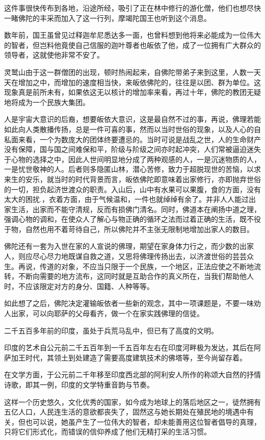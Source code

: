 \documentclass[twoside,openany]{book}
\begin{document}
这件事很快传布到各地，沿途所经，吸引了正在林中修行的游化僧，他们也想尽快一睹佛陀的丰采而加入了这一行列，摩竭陀国王也听到这个消息。

数年前，国王虽曾见过释迦牟尼悉达多一面，也曾料想到他将来必能成为一位伟大的智者，但岂料他竟使自己信服的迦叶尊者也皈依了他，成了一位拥有广大群众的领导者，这就使他非常不安了。

灵鹫山由于这一群僧团的出现，顿时热闹起来，自佛陀带弟子来到这里，人数一天天在增加之中，而增加的速度相当快，来皈依佛陀的，往往是以团、群为单位。这现象真是前所未有，如果依这无以核计的增加率来看，再过十年，佛陀的教团无疑地将成为一个民族大集团。

人是宇宙大意识的后裔，想要皈依大意识，这是最自然不过的事，再说，佛理若能如此向人类散播传扬，总是一件可喜的事，然而以当时世俗的现象，以及人心的自私面来看，一个为数庞大的团体终要遭忌的。当时可说是战乱之世，人的生命财产没有保障，国与国之间难保和平，阶级与阶级之间亦时起冲突，人们常被逼迫迷失于心物的选择之中，因此人世间明显地分成了两种观感的人，一是沉迷物质的人，一是忧世敬神的人。后者则多隐匿山林，潜心苦修，致力于超脱现世的苦恼，以求来生的安乐，就当时的时代背景而言，皈依佛陀即意味着出家修行，亦即抛弃世俗的一切，担负起济世渡众的职责。入山后，山中有水果可以果腹，食的方面，没有太大的困扰.，衣着方面，由于气候温和，一件也就绰绰有余了。并非人人能过出家生活，出家而不能守清规，反而有损佛门清名。同时，佛道本在阐扬中道之理，强调心物的调和，在使众人了解心与物正确的循环之法而过着正确的生活，既不役于物，自然也用不着苛待自己，所以佛陀并不主张无限制地增加出家人的数目。

佛陀还有一套为入世在家的人宣说的佛理，期望在家身体力行之，而少数的出家人，则应尽心尽力地既谋自救之道，又思将佛理传扬出去，以济渡世俗的芸芸众生。再说，传道的对象，不应当只限于一个民族，一个地区，正法应使之不断地流转，不断向需要的地方流布，这同时就是互助合作的真义所在，当我们帮助他人时，不应该限定对方的身分、国籍、人种等等。

如此想了之后，佛陀决定灌输皈依者一些新的观念，其中一项课题是，不要一味劝人出家，可以向耶萨的父母看齐，做一个在家实践佛理的信徒。

二千五百多年前的印度，虽处于兵荒马乱中，但已有了高度的文明。

印度的艺术自公元前二千五百年到一千五百年左右在印度河畔极为发达，其后在阿萨加王时代，其领土到处建造了需要高度建筑技术的佛塔等，至今尚留存着。

在文学方面，于公元前二千年移至印度西北部的阿利安人所作的称颂大自然的抒情诗歌，即其一例，印度的文学特重音韵与节奏。

这样一个历史悠久，文化优秀的国家，如今成为地球上的落后地区之一，徒然拥有五亿人口，人民连生活的意欲都丧失了，固然这与她长期处在殖民地的境遇中有关，但也可以说，她虽产生了一位伟大的智者，却未能善用这位智者倡导的真理，只将它们形式化，而错误的信仰养成了他们无精打采的生活习惯。
\end{document}

